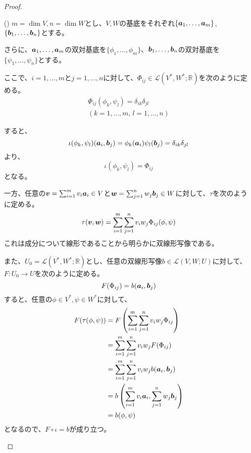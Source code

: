 \documentclass[../../../topic_linear-algebra]{subfiles}
\begin{document}
\begin{proof}
  \begin{subpattern}{()}
    $m = \dim V, n = \dim W$とし、$V, W$の基底をそれぞれ$\{\vb*{a}_1, \ldots, \vb*{a}_m\}$, $\{\vb*{b}_1, \ldots, \vb*{b}_n\}$とする。
    
    さらに、${\vb*{a}_1, \ldots, \vb*{a}_m}$の双対基底を$\{\phi_1, \ldots, \phi_m\}$、${\vb*{b}_1, \ldots, \vb*{b}_n}$の双対基底を$\{\psi_1, \ldots, \psi_n\}$とする。
    
    \br
    
    ここで、$i = 1, \ldots, m$と$j = 1, \ldots, n$に対して、$\Phi_{ij} \in \mathcal{L}(V^*, W^*; \mathbb{R})$を次のように定める。
    \begin{gather*}
      \Phi_{ij}(\phi_k, \psi_l) = \delta_{ik} \delta_{jl} \\(k = 1, \ldots, m,\, l = 1, \ldots, n)
    \end{gather*}
    
    すると、
    \begin{equation*}
      \iota(\phi_k, \psi_l)(\vb*{a}_i, \vb*{b}_j) = \phi_k(\vb*{a}_i) \psi_l(\vb*{b}_j) = \delta_{ik} \delta_{jl}
    \end{equation*}
    より、
    \begin{equation*}
      \iota(\phi_k, \psi_l) = \Phi_{ij}
    \end{equation*}
    となる。
    
    \br
    
    一方、任意の$\vb*{v} = \sum_{i=1}^m v_i \vb*{a}_i \in V$と$\vb*{w} = \sum_{j=1}^n w_j \vb*{b}_j \in W$に対して、$\tau$を次のように定める。
    \begin{equation*}
      \tau(\vb*{v}, \vb*{w}) = \sum_{i=1}^m \sum_{j=1}^n v_i w_j \Phi_{ij}(\phi, \psi)
    \end{equation*}
    これは成分について線形であることから明らかに双線形写像である。
    
    \br

    また、$U_0 = \mathcal{L}(V^*, W^*; \mathbb{R})$とし、任意の双線形写像$b \in \mathcal{L}(V, W; U)$に対して、$F \colon U_0 \to U$を次のように定める。
    \begin{equation*}
      F(\Phi_{ij}) = b(\vb*{a}_i, \vb*{b}_j)
    \end{equation*}
    すると、任意の$\phi \in V^*, \psi \in W^*$に対して、
    \begin{align*}
      F(\tau(\phi, \psi)) &= F\left(\sum_{i=1}^m \sum_{j=1}^n v_i w_j \Phi_{ij}\right) \\
      &= \sum_{i=1}^m \sum_{j=1}^n v_i w_j F(\Phi_{ij}) \\
      &= \sum_{i=1}^m \sum_{j=1}^n v_i w_j b(\vb*{a}_i, \vb*{b}_j) \\
      &= b\left(\sum_{i=1}^m v_i \vb*{a}_i, \sum_{j=1}^n w_j \vb*{b}_j\right) \\
      &= b(\phi, \psi)
    \end{align*}
    となるので、$F \circ \iota = b$が成り立つ。
    

\end{subpattern}
\end{proof}
\end{document}
